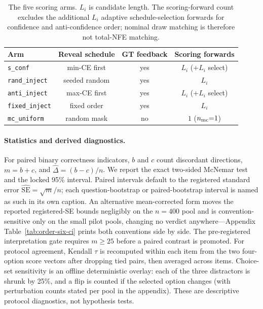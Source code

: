 \documentclass{article}
\newcommand{\sconf}{\texttt{s\_conf}}
\newcommand{\rinj}{\texttt{rand\_inject}}
\newcommand{\ainj}{\texttt{anti\_inject}}
\newcommand{\finj}{\texttt{fixed\_inject}}
\newcommand{\mcu}{\texttt{mc\_uniform}}
\begin{document}
\begin{table}[t]
\centering
\setlength{\tabcolsep}{3.4pt}
\caption{The five scoring arms.  $L_i$ is candidate length.  The scoring-forward
count excludes the additional $L_i$ adaptive schedule-selection forwards for
confidence and anti-confidence order; nominal draw matching is therefore not
total-NFE matching.}
\label{tab:arms}
\begin{tabular}{@{}lccc@{}}
\toprule
Arm & Reveal schedule & GT feedback & Scoring forwards \\
\midrule
\sconf{} & min-CE first & yes & $L_i$ ($+L_i$ select) \\
\rinj{} & seeded random & yes & $L_i$ \\
\ainj{} & max-CE first & yes & $L_i$ ($+L_i$ select) \\
\finj{} & fixed order & yes & $L_i$ \\
\mcu{} & random mask & no & \multicolumn{1}{c}{$1$ ($n_{\rm mc}{=}1$)} \\
\bottomrule
\end{tabular}
\end{table}

\paragraph{Statistics and derived diagnostics.}
For paired binary correctness indicators, $b$ and $c$ count discordant directions,
$m=b+c$, and $\widehat\Delta=(b-c)/n$.  We report the exact two-sided McNemar
test \citep{mcnemar1947} and the locked 95\% interval.  Paired intervals default
to the registered standard error $\widehat{\mathrm{SE}}=\sqrt{m}/n$; each
question-bootstrap or paired-bootstrap interval is named as such in its own
caption.  An
alternative mean-corrected form moves the reported registered-SE bounds
negligibly on the $n=400$ pool and is convention-sensitive only on the small
pilot pools, changing no verdict anywhere---Appendix
Table~\ref{tab:order-six-ci} prints both conventions side by side.  The
pre-registered interpretation gate requires $m\geq25$ before a paired contrast
is promoted.  For protocol agreement, Kendall
$\tau$ \citep{kendall1938} is recomputed within each item from the two
four-option score vectors after dropping tied pairs, then averaged across
items.  Choice-set sensitivity is an offline deterministic overlay: each of
the three distractors is shrunk by 25\%, and a flip is counted if the selected
option changes (with perturbation counts stated per pool in the appendix).
These are descriptive protocol diagnostics, not hypothesis tests.
\end{document}
